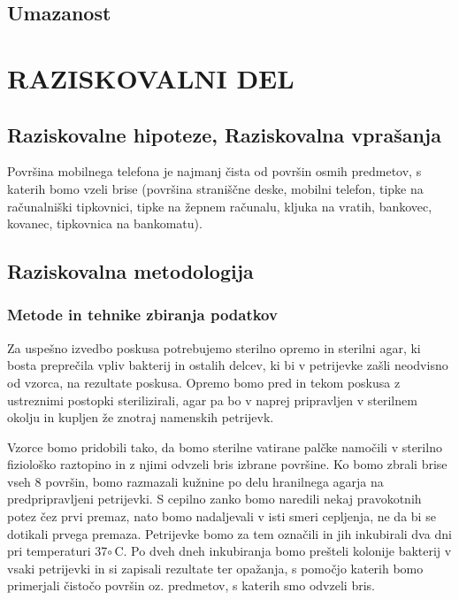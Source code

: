 \documentclass[12pt, a4paper, oneside]{report}
\begin{document}
\section{Umazanost}

\chapter{RAZISKOVALNI DEL}

\section{Raziskovalne hipoteze, Raziskovalna vprašanja}

Površina mobilnega telefona je najmanj čista od površin osmih predmetov, s katerih bomo vzeli brise (površina straniščne deske, mobilni telefon, tipke na računalniški tipkovnici, tipke na žepnem računalu, kljuka na vratih, bankovec, kovanec, tipkovnica na bankomatu).

\section{Raziskovalna metodologija}

\subsection{Metode in tehnike zbiranja podatkov}

Za uspešno izvedbo poskusa potrebujemo sterilno opremo in sterilni agar, ki bosta preprečila vpliv bakterij in ostalih delcev, ki bi v petrijevke zašli neodvisno od vzorca, na rezultate poskusa. Opremo bomo pred in tekom poskusa z ustreznimi postopki sterilizirali, agar pa bo v naprej pripravljen v sterilnem okolju in kupljen že znotraj namenskih petrijevk.

Vzorce bomo pridobili tako, da bomo sterilne vatirane palčke namočili v sterilno fiziološko raztopino in z njimi odvzeli bris izbrane površine. Ko bomo zbrali brise vseh 8 površin, bomo razmazali kužnine po delu hranilnega agarja na predpripravljeni petrijevki. S cepilno zanko bomo naredili nekaj pravokotnih potez čez prvi premaz, nato bomo nadaljevali v isti smeri cepljenja, ne da bi se dotikali prvega premaza. Petrijevke bomo za tem označili in jih inkubirali dva dni pri temperaturi 37$\circ$\,C. Po dveh dneh inkubiranja bomo prešteli kolonije bakterij v vsaki petrijevki in si zapisali rezultate ter opažanja, s pomočjo katerih bomo primerjali čistočo površin oz. predmetov, s katerih smo odvzeli bris.
\end{document}
